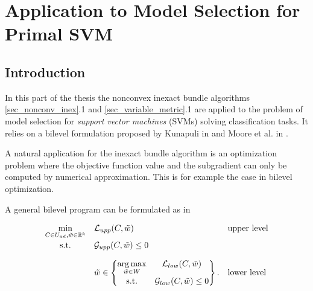 \section{Application to Model Selection for Primal SVM}
\label{sec_bilevel}


\subsection{Introduction}

In this part of the thesis the nonconvex inexact bundle algorithms \ref{sec_nonconv_inex}.1 and \ref{sec_variable_metric}.1 are applied to the problem of model selection for \emph{support vector machines} (SVMs) solving classification tasks.
It relies on a bilevel formulation proposed by Kunapuli in \cite{Kunapuli2008} and Moore et al. in \cite{Moore2011}.

A natural application for the inexact bundle algorithm is an optimization problem where the objective function value and the subgradient can only be computed by numerical approximation. This is for example the case in bilevel optimization.

A general bilevel program can be formulated as in \cite[p. 20]{Kunapuli2008}

\begin{equation}
	\begin{array}{cll}
	\displaystyle\min_{C \in U_{ad}, \tilde{w} \in \R^k} & \mathcal{L}_{upp}(C,\tilde{w}) & \text{upper level} \vspace{0.5ex}\\
	\text{s.t.} & \mathcal{G}_{upp}(C,\tilde{w}) \leq 0 & \vspace{1em}\\
	& \tilde{w} \in \begin{Bmatrix} \displaystyle\argmax_{\tilde{w}\in W} & \mathcal{L}_{low}(C,\tilde{w}) \vspace{0.5ex}\\
	                        \text{s.t.} & \mathcal{G}_{low}(C,\tilde{w}) \leq 0 
													\end{Bmatrix}. & \text{lower level}
	\end{array}
	\label{bilevel}
\end{equation}

